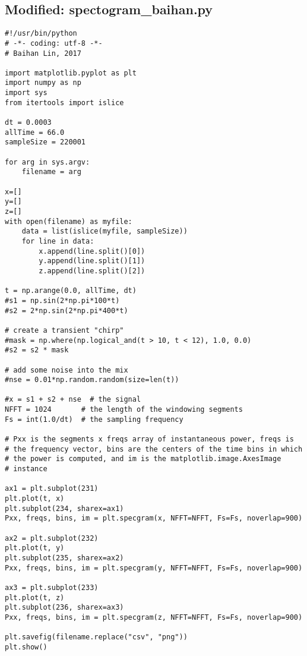 \documentclass{sigchi}
\begin{document}
\subsection{Modified: spectogram\_baihan.py}\label{ss:specPy}
\begin{lstlisting}
#!/usr/bin/python
# -*- coding: utf-8 -*-
# Baihan Lin, 2017

import matplotlib.pyplot as plt
import numpy as np
import sys
from itertools import islice

dt = 0.0003
allTime = 66.0
sampleSize = 220001

for arg in sys.argv:
	filename = arg

x=[]
y=[]
z=[]
with open(filename) as myfile:
    data = list(islice(myfile, sampleSize))
    for line in data:
        x.append(line.split()[0])
        y.append(line.split()[1])
        z.append(line.split()[2])

t = np.arange(0.0, allTime, dt)
#s1 = np.sin(2*np.pi*100*t)
#s2 = 2*np.sin(2*np.pi*400*t)

# create a transient "chirp"
#mask = np.where(np.logical_and(t > 10, t < 12), 1.0, 0.0)
#s2 = s2 * mask

# add some noise into the mix
#nse = 0.01*np.random.random(size=len(t))

#x = s1 + s2 + nse  # the signal
NFFT = 1024       # the length of the windowing segments
Fs = int(1.0/dt)  # the sampling frequency

# Pxx is the segments x freqs array of instantaneous power, freqs is
# the frequency vector, bins are the centers of the time bins in which
# the power is computed, and im is the matplotlib.image.AxesImage
# instance

ax1 = plt.subplot(231)
plt.plot(t, x)
plt.subplot(234, sharex=ax1)
Pxx, freqs, bins, im = plt.specgram(x, NFFT=NFFT, Fs=Fs, noverlap=900)

ax2 = plt.subplot(232)
plt.plot(t, y)
plt.subplot(235, sharex=ax2)
Pxx, freqs, bins, im = plt.specgram(y, NFFT=NFFT, Fs=Fs, noverlap=900)

ax3 = plt.subplot(233)
plt.plot(t, z)
plt.subplot(236, sharex=ax3)
Pxx, freqs, bins, im = plt.specgram(z, NFFT=NFFT, Fs=Fs, noverlap=900)

plt.savefig(filename.replace("csv", "png"))
plt.show()
\end{lstlisting}
\end{document}
